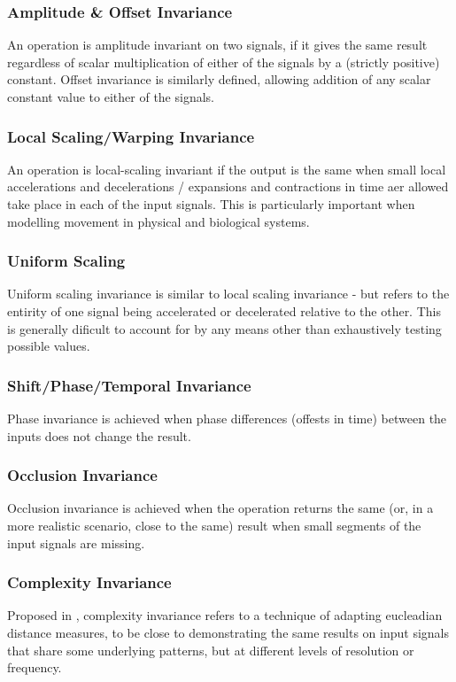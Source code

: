 \documentclass[9pt,conference]{IEEEtran}
\begin{document}
\subsubsection{Amplitude \& Offset Invariance} An operation is amplitude invariant on two signals, if it gives the same result regardless of scalar multiplication of either of the signals by a (strictly positive) constant. Offset invariance is similarly defined, allowing addition of any scalar constant value to either of the signals.
\subsubsection{Local Scaling/Warping Invariance} An operation is local-scaling invariant if the output is the same when small local accelerations and decelerations / expansions and contractions in time aer allowed take place in each of the input signals. This is particularly important when modelling movement in physical and biological systems. 
\subsubsection{Uniform Scaling} Uniform scaling invariance is similar to local scaling invariance - but refers to the entirity of one signal being accelerated or decelerated relative to the other. This is generally dificult to account for by any means other than exhaustively testing possible values.
\subsubsection{Shift/Phase/Temporal Invariance} Phase invariance is achieved when phase differences (offests in time) between the inputs does not change the result.
\subsubsection{Occlusion Invariance} Occlusion invariance is achieved when the operation returns the same (or, in a more realistic scenario, close to the same) result when small segments of the input signals are missing.
\subsubsection{Complexity Invariance} Proposed in \cite{batista2014cid}, complexity invariance refers to a technique of adapting eucleadian distance measures, to be close to demonstrating the same results on input signals that share some underlying patterns, but at different levels of resolution or frequency.
\end{document}

